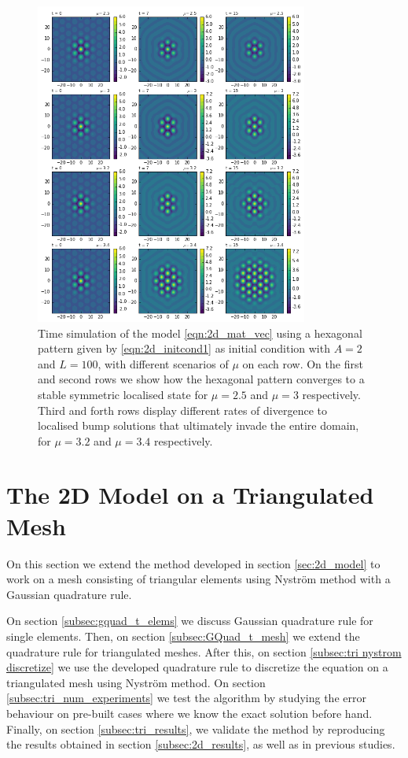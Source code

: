 \documentclass{uonmathreport}
\begin{document}
\begin{figure}[H]
	\begin{center}
		\includegraphics[width=0.8\textwidth]{Figures/2dRect_IC2_3249points.png}
	\end{center}
	\caption{Time simulation of the model \ref{eqn:2d_mat_vec} using a hexagonal pattern given by \ref{eqn:2d_initcond1} as initial condition with $A = 2$ and $L = 100$, with different scenarios of $\mu$ on each row. On the first and second rows we show how the hexagonal pattern converges to a stable symmetric localised state for $\mu = 2.5$ and $\mu = 3$ respectively. Third and forth rows display different rates of divergence to localised bump solutions that ultimately invade the entire domain, for $\mu=3.2$ and $\mu=3.4$ respectively.}
	\label{fig:2dRect_IC2}
\end{figure}

\section{The 2D Model on a Triangulated Mesh}
\label{sec:nf_t_domain}
On this section we extend the method developed in section \ref{sec:2d_model} to work on a mesh consisting of triangular elements using Nystr\"om method with a Gaussian quadrature rule.

On section \ref{subsec:gquad_t_elems} we discuss Gaussian quadrature rule for single elements. Then, on section \ref{subsec:GQuad_t_mesh} we extend the quadrature rule for triangulated meshes. After this, on section \ref{subsec:tri nystrom discretize} we use the developed quadrature rule to discretize the equation on a triangulated mesh using Nystr\"om method. On section \ref{subsec:tri_num_experiments} we test the algorithm by studying the error behaviour on pre-built cases where we know the exact solution before hand. Finally, on section \ref{subsec:tri_results}, we validate the method by reproducing the results obtained in section \ref{subsec:2d_results}, as well as in previous studies.
\end{document}
